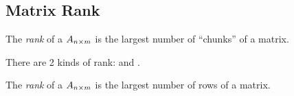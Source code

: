 \subsection{Matrix Rank}\label{subsec:Matrix_Rank}
\begin{definition}[Rank]\label{def:Matrix_Rank}
  The \emph{rank} of a  $A_{n \times m}$ is the largest number of  ``chunks'' of a matrix.

  There are 2 kinds of rank:  and .

  \begin{remark}\label{rmk:Row_Rank}
    The \emph{rank} of a  $A_{n \times m}$ is the largest number of  rows of a matrix.
  \end{remark}

\end{definition}


